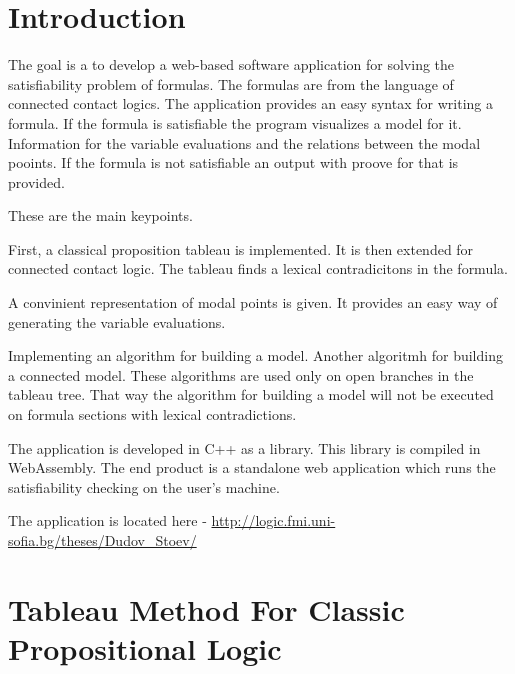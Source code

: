 \documentclass{article}
\begin{document}
	\section{Introduction}
	The goal is a to develop a web-based software application for solving the satisfiability problem of formulas. The formulas are from the language of connected contact logics. The application provides an easy syntax for writing a formula. If the formula is satisfiable the program visualizes a model for it. Information for the variable evaluations and the relations between the modal pooints. If the formula is not satisfiable an output with proove for that is provided.

	These are the main keypoints.

	First, a classical proposition tableau is implemented. It is then extended for connected contact logic. The tableau finds a lexical contradicitons in the formula.

	A convinient representation of modal points is given. It provides an easy way of generating the variable evaluations.

	Implementing an algorithm for building a model. Another algoritmh for building a connected model. These algorithms are used only on open branches in the tableau tree. That way the algorithm for building a model will not be executed on formula sections with lexical contradictions.

	The application is developed in C++ as a library. This library is compiled in WebAssembly. The end product is a standalone web application which runs the satisfiability checking on the user's machine.

	The application is located here - \url{http://logic.fmi.uni-sofia.bg/theses/Dudov_Stoev/}

	\newpage

	\section{Tableau Method For Classic Propositional Logic}
\end{document}
